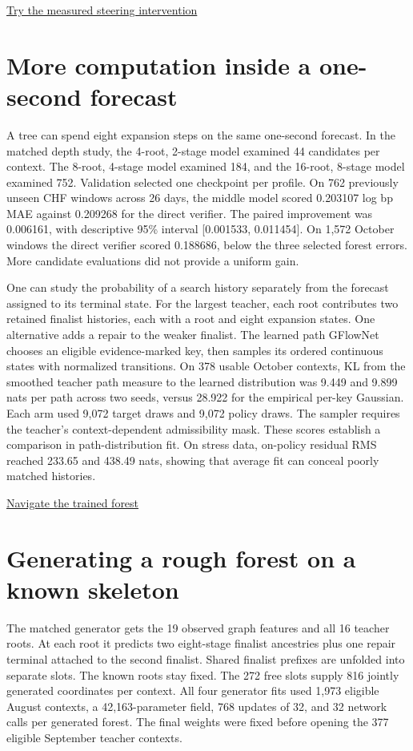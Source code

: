 \documentclass[11pt,oneside,openany]{book}
\begin{document}
{\small\sffamily\href{https://amelie-iska.github.io/phaseweave-lab/reasoning.html?mode=steering}{Try the measured steering intervention}\par}
\section*{More computation inside a one-second forecast}
A tree can spend eight expansion steps on the same one-second forecast. In the matched depth study, the 4-root, 2-stage model examined 44 candidates per context. The 8-root, 4-stage model examined 184, and the 16-root, 8-stage model examined 752. Validation selected one checkpoint per profile. On 762 previously unseen CHF windows across 26 days, the middle model scored 0.203107 log bp MAE against 0.209268 for the direct verifier. The paired improvement was 0.006161, with descriptive 95\% interval [0.001533, 0.011454]. On 1,572 October windows the direct verifier scored 0.188686, below the three selected forest errors. More candidate evaluations did not provide a uniform gain.

One can study the probability of a search history separately from the forecast assigned to its terminal state. For the largest teacher, each root contributes two retained finalist histories, each with a root and eight expansion states. One alternative adds a repair to the weaker finalist. The learned path GFlowNet chooses an eligible evidence-marked key, then samples its ordered continuous states with normalized transitions. On 378 usable October contexts, KL from the smoothed teacher path measure to the learned distribution was 9.449 and 9.899 nats per path across two seeds, versus 28.922 for the empirical per-key Gaussian. Each arm used 9,072 target draws and 9,072 policy draws. The sampler requires the teacher's context-dependent admissibility mask. These scores establish a comparison in path-distribution fit. On stress data, on-policy residual RMS reached 233.65 and 438.49 nats, showing that average fit can conceal poorly matched histories.

{\small\sffamily\href{https://amelie-iska.github.io/phaseweave-lab/reasoning.html?mode=forest}{Navigate the trained forest}\par}
\section*{Generating a rough forest on a known skeleton}
The matched generator gets the 19 observed graph features and all 16 teacher roots. At each root it predicts two eight-stage finalist ancestries plus one repair terminal attached to the second finalist. Shared finalist prefixes are unfolded into separate slots. The known roots stay fixed. The 272 free slots supply 816 jointly generated coordinates per context. All four generator fits used 1,973 eligible August contexts, a 42,163-parameter field, 768 updates of 32, and 32 network calls per generated forest. The final weights were fixed before opening the 377 eligible September teacher contexts.
\end{document}
